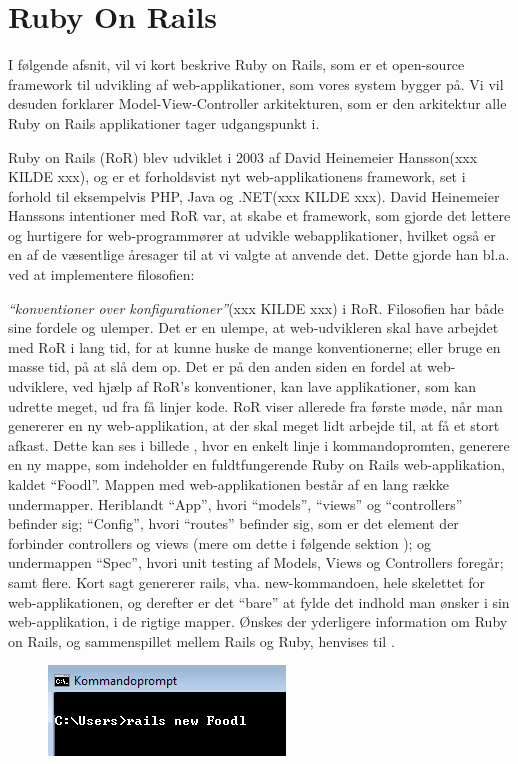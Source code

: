 \section{Ruby On Rails}
I følgende afsnit, vil vi kort beskrive Ruby on Rails, som er et open-source framework til udvikling af web-applikationer, som vores system bygger på. Vi vil desuden forklarer Model-View-Controller arkitekturen, som er den arkitektur alle Ruby on Rails applikationer tager udgangspunkt i.  

Ruby on Rails (RoR) blev udviklet i 2003 af David Heinemeier Hansson(xxx KILDE xxx), og er et forholdsvist nyt web-applikationens framework, set i forhold til eksempelvis PHP, Java og .NET(xxx KILDE xxx). David Heinemeier Hanssons intentioner med RoR var, at skabe et framework, som gjorde det lettere og hurtigere for web-programmører at udvikle webapplikationer, hvilket også er en af de væsentlige åresager til at vi valgte at anvende det. Dette gjorde han bl.a. ved at implementere filosofien: {\emph{``konventioner over konfigurationer''}(xxx KILDE xxx) i RoR. Filosofien har både sine fordele og ulemper. Det er en ulempe, at web-udvikleren skal have arbejdet med RoR i lang tid, for at kunne huske de mange konventionerne; eller bruge en masse tid, på at slå dem op. Det er på den anden siden en fordel at web-udviklere, ved hjælp af RoR's konventioner, kan lave applikationer, som kan udrette meget, ud fra få linjer kode. RoR viser allerede fra første møde, når man genererer en ny web-applikation, at der skal meget lidt arbejde til, at få et stort afkast. Dette kan ses i billede , hvor en enkelt linje i kommandopromten, generere en ny mappe, som indeholder en fuldtfungerende Ruby on Rails web-applikation, kaldet ``Foodl''. Mappen med web-applikationen består af en lang række undermapper. Heriblandt ``App'', hvori ``models'', ``views'' og ``controllers'' befinder sig; ``Config'', hvori ``routes'' befinder sig, som er det element der forbinder controllers og views (mere om dette i følgende sektion \cite{MVC}); og undermappen ``Spec'', hvori unit testing af Models, Views og Controllers foregår; samt flere. Kort sagt genererer rails, vha. new-kommandoen, hele skelettet for web-applikationen, og derefter er det ``bare'' at fylde det indhold man ønsker i sin web-applikation, i de rigtige mapper. Ønskes der yderligere information om Ruby on Rails, og sammenspillet mellem Rails og Ruby, henvises til \cite{RoR.org}.

\begin{figure}
\centering
\includegraphics[scale=0.6]{billeder/Rails-new-foodl.png}
\label{fig:Rails-new-foodl}
\end{figure}

}
